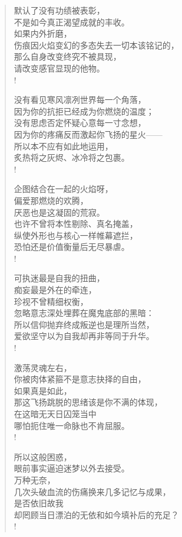 \documentclass[UTF8, 12pt, a4paper]{ctexrep} %
\begin{document}
\begin{verse}
    默认了没有功绩被表彰，\\
    不是如今真正渴望成就的丰收。\\
    如果内外折磨，\\
    伤痕因火焰变幻的多态失去一切本该铭记的，\\
    那么自身改变终究不被具现，\\
    请改变感官显现的他物。\\!

    没有看见寒风凛冽世界每一个角落，\\
    因为你的抗拒已经成为你燃烧的温度；\\
    没有思虑否定怀疑心意每一寸念想，\\
    因为你的疼痛反而激起你飞扬的星火——\\
    所以本不应有如此地运用，\\
    炙热将之灰烬、冰冷将之包裹。\\!

    企图结合在一起的火焰呀，\\
    偏爱那燃烧的欢腾，\\
    厌恶也是这凝固的荒寂。\\
    也许不曾将本性剔除、真名掩盖，\\
    纵使外形也与核心一样帷幕遮拦，\\
    恐怕还是价值衡量后无尽暴虐。\\!

    可执迷最是自我的扭曲，\\
    痴妄最是外在的牵连，\\
    珍视不曾精细权衡，\\
    忽略意志深处埋葬在魔鬼底部的黑暗：\\
    所以信仰抛弃终成叛逆也是理所当然，\\
    爱欲坚守以为自我却再非等同于升华。\\!

    激荡灵魂左右，\\
    你被肉体紧箍不是意志抉择的自由，\\
    如果真是如此，\\
    那这飞扬跳脱的思绪该是你不满的体现，\\
    在这暗无天日囚笼当中\\
    哪怕扼住唯一命脉也不肯屈服。\\!

    所以这般困惑，\\
    眼前事实逼迫迷梦以外去接受。\\
    万种无奈，\\
    几次头破血流的伤痛换来几多记忆与成果，\\
    是否依旧故我\\
    却罔顾当日漂泊的无依和如今填补后的充足？\\!


\end{verse}
\end{document}

